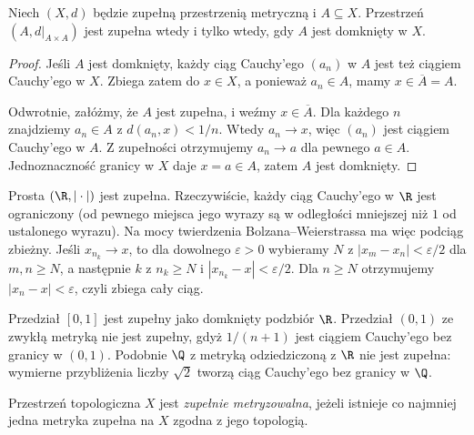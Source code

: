 \begin{twierdzenie}
\label{thm:topog-baire-podprzestrzen-zupelna}
Niech $(X,d)$ będzie zupełną przestrzenią metryczną
i $A\subseteq X$. Przestrzeń $(A,d|_{A\times A})$
jest zupełna wtedy i tylko wtedy, gdy $A$ jest domknięty w $X$.
\end{twierdzenie}
\begin{proof}
Jeśli $A$ jest domknięty, każdy ciąg Cauchy'ego
$(a_n)$ w $A$ jest też ciągiem Cauchy'ego w $X$.
Zbiega zatem do $x\in X$, a ponieważ $a_n\in A$,
mamy $x\in\overline A=A$.

Odwrotnie, załóżmy, że $A$ jest zupełna, i weźmy
$x\in\overline A$. Dla każdego $n$ znajdziemy
$a_n\in A$ z $d(a_n,x)<1/n$. Wtedy $a_n\to x$,
więc $(a_n)$ jest ciągiem Cauchy'ego w $A$.
Z zupełności otrzymujemy $a_n\to a$ dla pewnego
$a\in A$. Jednoznaczność granicy w $X$ daje
$x=a\in A$, zatem $A$ jest domknięty.
\end{proof}

\begin{przyklad}
\label{ex:topog-baire-podstawowe-przyklady}
Prosta $(\R,|\cdot|)$ jest zupełna. Rzeczywiście,
każdy ciąg Cauchy'ego w $\R$ jest ograniczony
(od pewnego miejsca jego wyrazy są w odległości
mniejszej niż $1$ od ustalonego wyrazu).
Na mocy twierdzenia Bolzana--Weierstrassa
ma więc podciąg zbieżny. Jeśli $x_{n_k}\to x$,
to dla dowolnego $\varepsilon>0$ wybieramy $N$
z $|x_m-x_n|<\varepsilon/2$ dla $m,n\ge N$,
a następnie $k$ z $n_k\ge N$ i
$|x_{n_k}-x|<\varepsilon/2$. Dla $n\ge N$
otrzymujemy $|x_n-x|<\varepsilon$, czyli
zbiega cały ciąg.

Przedział $[0,1]$ jest zupełny jako domknięty
podzbiór $\R$. Przedział $(0,1)$ ze zwykłą
metryką nie jest zupełny, gdyż $1/(n+1)$
jest ciągiem Cauchy'ego bez granicy w $(0,1)$.
Podobnie $\Q$ z metryką odziedziczoną z $\R$
nie jest zupełna: wymierne przybliżenia liczby
$\sqrt2$ tworzą ciąg Cauchy'ego bez granicy w $\Q$.
\end{przyklad}

\begin{definicja}
\label{def:topog-baire-zupelna-metryzowalnosc}
Przestrzeń topologiczna $X$ jest
\emph{zupełnie metryzowalna}, jeżeli istnieje
co najmniej jedna metryka zupełna na $X$
zgodna z jego topologią.
\end{definicja}

